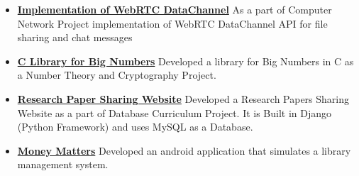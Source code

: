 \begin{resume}
\begin{itemize}
\item \textbf{\href{https://github.com/dip-kush/crypto_project}{\textbf{Implementation of WebRTC DataChannel}}}
As a part of Computer Network Project implementation of WebRTC DataChannel API for file sharing and chat messages

\item \textbf{{\href{https://github.com/dip-kush/crypto_project}{\textbf{C Library for Big Numbers}}}}
Developed a library for Big Numbers in C as a Number Theory and Cryptography Project.

\item \textbf{{\href{https://github.com/dip-kush/dbms_django_project}{\textbf{Research Paper Sharing Website}}}}
Developed a Research Papers Sharing Website as a part of Database Curriculum Project. 
It is Built in Django (Python Framework) and uses MySQL as a Database.

\item \textbf{\href{https://github.com/dip-kush/Money-Matters}{\textbf{Money Matters}}}
Developed an android application that simulates a library management system.

\end{itemize}








 




\end{resume}
